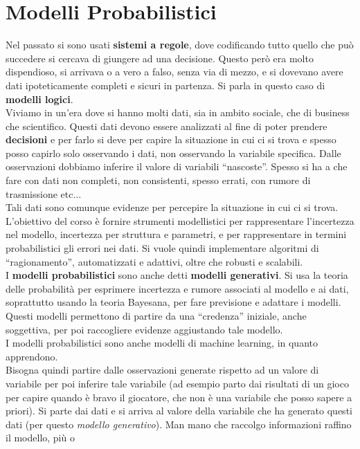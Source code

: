 \documentclass[a4paper,12pt, oneside]{book}
\begin{document}
\chapter{Modelli Probabilistici}
Nel passato si sono usati \textbf{sistemi a regole}, dove codificando tutto
quello che può succedere si cercava di giungere ad una decisione. Questo però
era molto dispendioso, si arrivava o a vero a falso, senza via di mezzo, e si
dovevano avere dati ipoteticamente completi e sicuri in partenza. Si parla in
questo caso di \textbf{modelli logici}.\\
Viviamo in un'era dove si hanno molti dati, sia in ambito sociale, che di
business che scientifico. Questi dati devono essere analizzati al fine di poter
prendere \textbf{decisioni} e per farlo si deve per capire la situazione in cui
ci si trova e spesso posso capirlo solo osservando i dati, non osservando la
variabile specifica. Dalle osservazioni dobbiamo inferire il valore di variabili
``nascoste''. Spesso si ha a che fare con dati non completi, non consistenti,
spesso errati, con rumore di trasmissione etc$\ldots$\\
Tali dati sono comunque
evidenze per percepire la situazione in cui ci si trova. L'obiettivo del corso è
fornire strumenti modellistici per rappresentare l'incertezza nel modello,
incertezza per struttura e parametri, e per rappresentare in termini
probabilistici gli errori nei dati. Si vuole quindi implementare algoritmi di
``ragionamento'', automatizzati e adattivi, oltre che robusti e scalabili.\\
I \textbf{modelli probabilistici} sono anche detti \textbf{modelli
  generativi}. Si usa la teoria delle probabilità per esprimere incertezza e
rumore associati al modello e ai dati, soprattutto usando la teoria Bayesana,
per fare previsione e adattare i modelli. Questi modelli permettono di partire
da una ``credenza'' iniziale, anche soggettiva, per poi raccogliere evidenze
aggiustando tale modello.\\
I modelli probabilistici sono anche modelli di machine learning, in quanto
apprendono.\\
Bisogna quindi partire dalle osservazioni generate rispetto ad un valore di
variabile per poi inferire tale variabile (ad esempio parto dai risultati di un
gioco per capire quando è bravo il giocatore, che non è una variabile che posso
sapere a priori). Si parte dai dati e si arriva al
valore della variabile che ha generato questi dati (per questo \textit{modello
  generativo}). Man mano che raccolgo informazioni raffino il modello, più o
\end{document}
